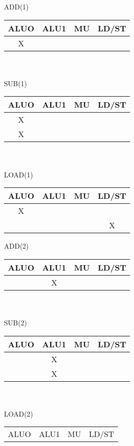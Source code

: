 \documentclass{report}
\begin{document}
\vspace{-1em}
\begin{multicols}{3}
ADD(1) \\
\begin{tabular}{|c|c|c|c|}
  \hline
  ALUO & ALU1 & MU & LD/ST \\
  \hline
  X    &      &    &       \\
  \hline
\end{tabular} \\ \ \\
SUB(1) \\
\begin{tabular}{|c|c|c|c|}
  \hline
  ALUO & ALU1 & MU & LD/ST \\
  \hline
  X     &     &    &       \\
  \hline
  X     &     &    &       \\
  \hline
\end{tabular} \\ \ \\
LOAD(1) \\
\begin{tabular}{|c|c|c|c|}
  \hline
  ALUO & ALU1 & MU & LD/ST \\
  \hline
  X     &     &    &      \\
  \hline 
        &     &    & X    \\
  \hline
\end{tabular}
  \vfill\columnbreak
ADD(2) \\
\begin{tabular}{|c|c|c|c|}
  \hline
  ALUO & ALU1 & MU & LD/ST \\
  \hline
       & X    &    &       \\
  \hline
\end{tabular} \\ \ \\
SUB(2) \\
\begin{tabular}{|c|c|c|c|}
  \hline
  ALUO & ALU1 & MU & LD/ST \\
  \hline
       & X    &    &       \\
  \hline 
       & X    &    &       \\
  \hline
\end{tabular} \\ \ \\
LOAD(2) \\
\begin{tabular}{|c|c|c|c|}
  \hline
  ALUO & ALU1 & MU & LD/ST \\

\end{tabular}
\end{multicols}
\end{document}
